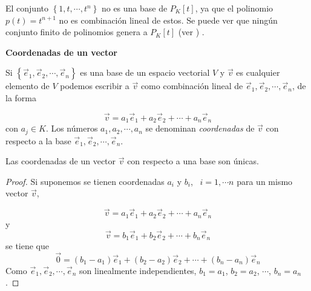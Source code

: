 \bigskip

\begin{remark}
    El conjunto $\left\{1,t,\cdots, t^{n}\right\}$ no es una base de $P_K\left[t\right]$, ya que el polinomio $p(t)=t^{n+1}$ no es combinación lineal de estos. Se puede ver que ningún conjunto finito de polinomios  genera a $P_K\left[t\right]$ (ver  \cite{grossman}) .
\end{remark}

\bigskip

\newpage

\textbf{Coordenadas de un vector}

Si $\left\{\vec{e}_1,\vec{e}_2,\cdots, \vec{e}_n\right\}$ es una base de un espacio vectorial $V$ y $\vec{v}$ es cualquier elemento de $V$ podemos escribir a $\vec{v}$ como combinación lineal de $\vec{e}_1,\vec{e}_2,\cdots, \vec{e}_n$, de la forma

$$\vec{v}=  a_1\vec{e}_1+a_2\vec{e}_2+\cdots +a_n \vec{e}_n$$
con $a_j \in K$. Los números $a_1,a_2,\cdots,a_n$ se denominan \textit{coordenadas} de $\vec{v}$ con respecto a la base $\vec{e}_1,\vec{e}_2,\cdots, \vec{e}_n$.

\bigskip

\bigskip

\bigskip


\begin{theorem}
    
Las coordenadas de un vector $\vec{v}$ con respecto a una base son únicas.
 \begin{proof}
     Si suponemos se tienen  coordenadas $a_i$ y $b_i$, ~$i=1, \cdots n$ para un mismo vector $\vec{v}$,

$$\vec{v}=  a_1\vec{e}_1+a_2\vec{e}_2+\cdots +a_n \vec{e}_n$$
y 
$$\vec{v}=  b_1\vec{e}_1+b_2\vec{e}_2+\cdots +b_n \vec{e}_n$$
\noindent
se tiene  que 
$$\vec{0}=  (b_1-a_1)\vec{e}_1+(b_2-a_2)\vec{e}_2+\cdots +(b_n-a_n) \vec{e}_n$$
Como  $\vec{e}_1,\vec{e}_2,\cdots, \vec{e}_n$ son linealmente independientes,  $b_1=a_1$,  $b_2=a_2$, $\cdots$, $b_n=a_n$.
\end{proof}
\end{theorem}

\bigskip




